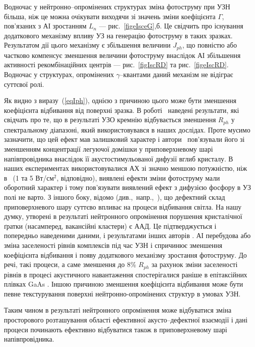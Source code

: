 Водночас у нейтронно--опромінених структурах зміна фотоструму при УЗН більша,
ніж це можна очікувати виходячи зі значень зміни коефіцієнта $\Gamma$, пов’язаних з АІ зростанням $L_n$ --- рис.~\ref{figeIsceG},б.
Це свідчить про існування додаткового механізму впливу УЗ на генерацію фотоструму в таких зразках.
Результатом дії цього механізму є збільшення величини $J_{ph}$, що повністю або частково компенсує
зменшення величини фотоструму внаслідок АІ збільшення активності рекомбінаційних центрів --- рис.~\ref{figIscRD} та рис.~\ref{figeIscRD}.
Водночас у структурах, опромінених $\gamma$--квантами даний механізм не відіграє суттєвої ролі.


Як видно з виразу~(\ref{eqIph}), однією з причиною цього може бути зменшення коефіцієнта відбивання від поверхні зразка.
В роботі~\cite{Zaver} наведені результати, які свідчать про те, що в результаті УЗО кремнію відбувається
зменшення $R_{ph}$ у спектральному
діапазоні, який використовувався в наших дослідах.
Проте мусимо зазначити, що цей ефект мав залишковий характер і
автори~\cite{Zaver} пов’язували його зі зменшенням концентрації
легуючої домішки у приповерхневому шарі напівпровідника внаслідок
її акустостимульованої дифузії вглиб кристалу.
В наших експериментах використовувалися АХ зі значно меншою потужністю, ніж
в~\cite{Zaver} (1 та 5 Вт/см$^2$, відповідно),  виявлені ефекти зміни фотоструму мали оборотний характер
і тому пов'язувати виявлений ефект з дифузією фосфору в УЗ полі не варто.
З іншого боку, відомо (див.,~напр.,~\cite{Kizel}), що дефектний склад
приповерхневого шару суттєво впливає на процеси відбивання світла.
На нашу думку, утворені в результаті нейтронного опромінення порушення кристалічної ґратки
(насамперед, вакансійні кластери) є ААД.
Це підтверджується і попередньо наведеними даними, і результатами інших авторів \cite{YOlikh2006TPLr}.
АІ перебудова або зміна заселеності рівнів комплексів під час УЗН і спричинює зменшення коефіцієнта відбивання
і появу додаткового механізму зростання фотоструму.
До речі, такі процеси, а саме зменшення до 8\% $R_{ph}$ за рахунок зміни заселеності рівнів в
процесі акустичного навантаження спостерігалися раніше в
епітаксійних плівках GaAs \cite{Korotch}.
Іншою причиною зменшення
коефіцієнта відбивання може бути певне текстурування поверхні нейтронно-опромінених
структур в умовах УЗН.

Таким чином в результаті нейтронного опромінення може відбуватися
зміна просторового розташування області ефективної акусто--дефектної
взаємодії і дані процеси починають ефективно відбуватися також в
приповерхневому шарі напівпровідника.



